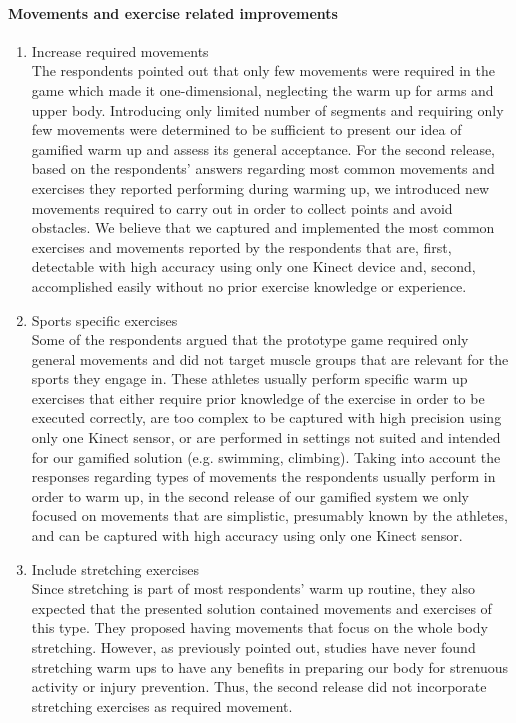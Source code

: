 \paragraph{Movements and exercise related improvements}
\begin{enumerate}
\item Increase required movements\\
The respondents pointed out that only few movements were required in the game which made it one-dimensional, neglecting the warm up for arms and upper body. Introducing only limited number of segments and requiring only few movements were determined to be sufficient to present our idea of gamified warm up and assess its general acceptance. For the second release, based on the respondents' answers regarding most common movements and exercises they reported performing during warming up, we introduced new movements required to carry out in order to collect points and avoid obstacles. We believe that we captured and implemented the most common exercises and movements reported by the respondents that are, first, detectable with high accuracy using only one Kinect device and, second, accomplished easily without no prior exercise knowledge or experience. %
\item Sports specific exercises\\
Some of the respondents argued that the prototype game required only general movements and did not target muscle groups that are relevant for the sports they engage in. These athletes usually perform specific warm up exercises that either require prior knowledge of the exercise in order to be executed correctly, are too complex to be captured with high precision using only one Kinect sensor, or are performed in settings not suited and intended for our gamified solution (e.g. swimming, climbing). Taking into account the responses regarding types of movements the respondents usually perform in order to warm up, in the second release of our gamified system we only focused on movements that are simplistic, presumably known by the athletes, and can be captured with high accuracy using only one Kinect sensor.
\item Include stretching exercises\\
Since stretching is part of most respondents' warm up routine, they also expected that the presented solution contained movements and exercises of this type. They proposed having movements that focus on the whole body stretching. However, as previously pointed out, studies have never found stretching warm ups to have any benefits in preparing our body for strenuous activity or injury prevention. Thus, the second release did not incorporate stretching exercises as required movement. %

\end{enumerate}
